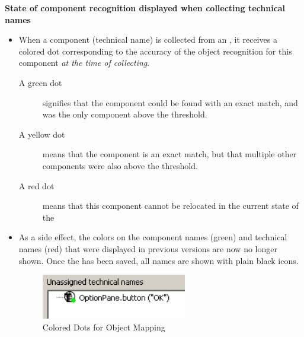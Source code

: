 \textbf{State of component recognition displayed when collecting technical names}
\label{RNCompRec}
\begin{itemize}
\item When a component (technical name) is collected from an \gdaut{}, it receives a colored
dot corresponding to the accuracy of the object recognition for this component \textit{at the time of collecting}.
\begin{description}
\item [A green dot]{signifies that the component could be found with an exact match, and was the only component above the threshold}.
\item [A yellow dot]{means that the component is an exact match, but that multiple other components were also above the threshold.}
\item [A red dot]{ means that this component cannot be relocated in the current state of the \gdaut{}}
\end{description}
\item As a side effect, the colors on the component names (green) and technical names (red) that were displayed in previous versions are now no longer shown. Once the \gdomeditor{} has been saved, all names are shown with plain black icons. 
\begin{figure}[h]
\begin{center}
\includegraphics[width=0.6\textwidth]{52/ps/ColorDot}
\caption{Colored Dots for Object Mapping}
\label{RNColorDot}
\end{center}
\end{figure}
\end{itemize}

